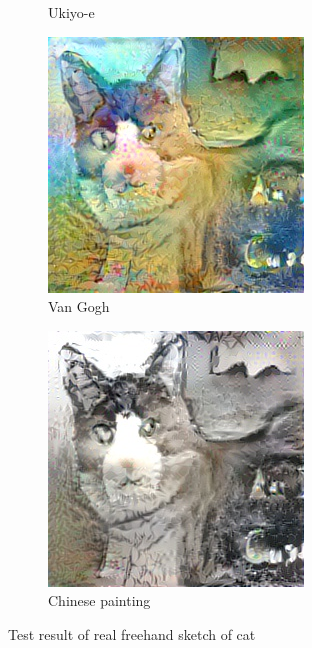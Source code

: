 \documentclass[10pt,twocolumn,letterpaper]{article}
\begin{document}
\begin{figure}[!h]
\begin{subfigure}[b]{0.16\textwidth}
  \caption{Ukiyo-e}
  \label{fig::reslfsh}
\end{subfigure}
%
\begin{subfigure}[b]{0.16\textwidth}
  \includegraphics[width=\textwidth]{figure/realdraw/fg.jpg}
\caption{Van Gogh}
  \label{fig::realfg}
\end{subfigure}
%
\begin{subfigure}[b]{0.16\textwidth}
  \includegraphics[width=\textwidth]{figure/realdraw/chinese.jpg}
  \caption{Chinese painting}
  \label{fig::realchinese}
\end{subfigure}
\caption{Test result of real freehand sketch of cat}
\label{fig::realtest}
\end{figure}
\end{document}
